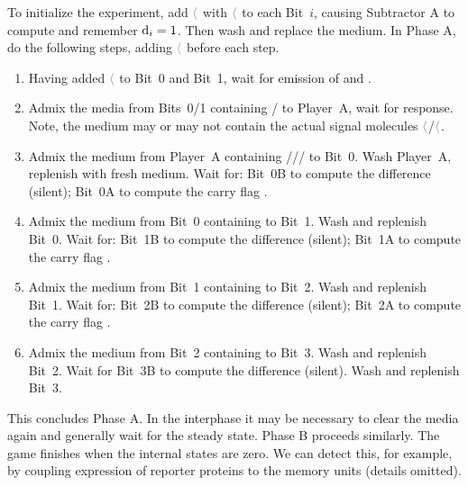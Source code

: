 \documentclass[12pt,notitlepage]{article}
\newcommand{\cbra}[1]{{\ensuremath{\color{gray}{#1}}}}
\newcommand{\signal}[1]{{{\cbra{\langle}\ce{#1}\cbra{\rangle}}}}
\newcommand{\ra}[1]{{\color{Blue}#1}}
\begin{document}
\ra{
To initialize the experiment,
add 
\signal{w_B} with \signal{s_i}
to each Bit~$i$,
causing Subtractor A to compute and remember $\ce{d_i} = 1$.
%
Then wash and replace the medium.
}
%
%
In Phase A,
do the following steps,
\ra{adding \signal{w_A} before each step}.
%
\begin{enumerate}
\item
    \ra{
    Having added \signal{w_A} to Bit~0 and Bit~1,
    wait for emission of \ce{s_1} and \ce{s_0}.
    }
\item
    Admix the media from Bits~0/1
    containing / to Player~A,
    wait for response.
    \ra{
    Note, the medium may or may not contain
    the actual signal molecules \signal{s_0}/\signal{s_1}.
    }
\item
    \ra{
    Admix the medium from Player~A 
    containing /\ce{r_1}/\ce{s_0}/\ce{s_1}
    to Bit~0.
    Wash Player~A, replenish with fresh medium.
    }
    \ra{
    Wait for:
    Bit~0B to compute the difference  (silent);
    Bit~0A to compute the carry flag . 
    }
\item
    \ra{
    Admix the medium from Bit~0 containing \ce{c_1} to Bit~1.
    }
    Wash and replenish Bit~0.
    \ra{
    Wait for:
    Bit~1B to compute the difference  (silent);
    Bit~1A to compute the carry flag . 
    }
\item
    \ra{
    Admix the medium from Bit~1 containing \ce{c_2}
    to Bit~2.
    }
    \ra{
    Wash and replenish Bit~1.
    }
    \ra{
    Wait for:
    Bit~2B to compute the difference  (silent);
    Bit~2A to compute the carry flag . 
    }
\item
    \ra{
    Admix the medium from Bit~2 containing \ce{c_3}
    to Bit~3.
    }
    \ra{
    Wash and replenish Bit~2.
    }
    \ra{
    Wait for
    Bit~3B to compute the difference  (silent).
    }
    Wash and replenish Bit~3.
\end{enumerate}

%

\ra{
This concludes Phase A.
%
In the interphase it may be necessary
to clear the media again
and generally wait for the steady state.
}
%
Phase B proceeds similarly.
%
\ra{
The game finishes when 
the internal states  are zero.
%
We can detect this,
for example,
by coupling expression of reporter proteins
to the memory units
(details omitted).
}
\end{document}

